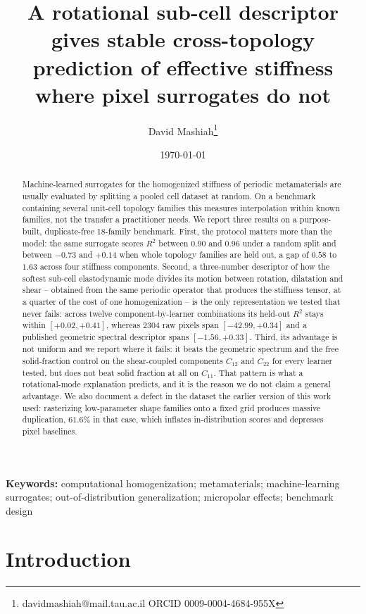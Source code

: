 \documentclass[11pt,a4paper]{article}
\title{\bfseries A rotational sub-cell descriptor gives stable cross-topology\\
prediction of effective stiffness where pixel surrogates do not}
\author[1]{David Mashiah\thanks{davidmashiah@mail.tau.ac.il \quad ORCID 0009-0004-4684-955X}}
\affil[1]{School of Mechanical Engineering, Tel Aviv University, Tel Aviv 6997801, Israel}
\date{\today}
\newcommand{\Rtwo}{R^{2}}
\begin{document}
\maketitle

\begin{abstract}
\noindent
Machine-learned surrogates for the homogenized stiffness of periodic metamaterials are
usually evaluated by splitting a pooled cell dataset at random. On a benchmark containing
several unit-cell topology families this measures interpolation within known families, not
the transfer a practitioner needs. We report three results on a purpose-built,
duplicate-free 18-family benchmark. First, the protocol matters more than the model: the
same surrogate scores $\Rtwo$ between $0.90$ and $0.96$ under a random split and between
$-0.73$ and $+0.14$ when whole topology families are held out, a gap of $0.58$ to $1.63$
across four stiffness components. Second, a three-number descriptor of how the softest
sub-cell elastodynamic mode divides its motion between rotation, dilatation and shear --
obtained from the same periodic operator that produces the stiffness tensor, at a quarter
of the cost of one homogenization -- is the only representation we tested that never fails:
across twelve component-by-learner combinations its held-out $\Rtwo$ stays within
$[+0.02, +0.41]$, whereas $2304$ raw pixels span $[-42.99, +0.34]$ and a published
geometric spectral descriptor spans $[-1.56,+0.33]$. Third, its advantage is not uniform
and we report where it fails: it beats the geometric spectrum and the free solid-fraction
control on the shear-coupled components $C_{12}$ and $C_{22}$ for every learner tested, but
does not beat solid fraction at all on $C_{11}$. That pattern is what a
rotational-mode explanation predicts, and it is the reason we do not claim a general
advantage. We also document a defect in the dataset the earlier version of this work used:
rasterizing low-parameter shape families onto a fixed grid produces massive duplication,
$61.6\%$ in that case, which inflates in-distribution scores and depresses pixel baselines.
\end{abstract}

\noindent\textbf{Keywords:} computational homogenization; metamaterials; machine-learning
surrogates; out-of-distribution generalization; micropolar effects; benchmark design

\section{Introduction}
\end{document}
